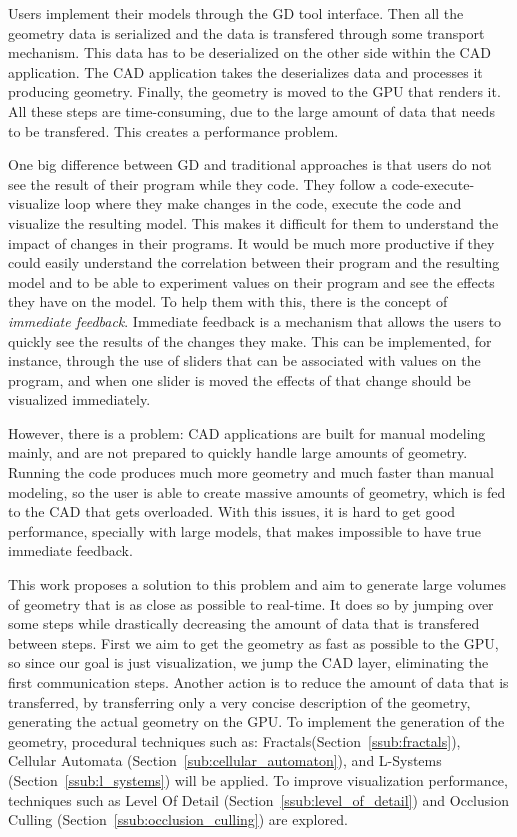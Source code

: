 Users implement their models through the GD tool interface. Then all the geometry data is serialized and the data is transfered through some transport mechanism. This data has to be deserialized on the other side within the CAD application. The CAD application takes the deserializes data and processes it producing geometry. Finally, the geometry is moved to the GPU that renders it. All these steps are time-consuming, due to the large amount of data that needs to be transfered. This creates a performance problem.

One big difference between GD and traditional approaches is that users do not see the result of their program while they code. They follow a code-execute-visualize loop where they make changes in the code, execute the code and visualize the resulting model. This makes it difficult for them to understand the impact of changes in their programs. It would be much more productive if they could easily understand the correlation between their program and the resulting model and to be able to experiment values on their program and see the effects they have on the model. To help them with this, there is the concept of \emph{immediate feedback}. Immediate feedback is a mechanism that allows the users to quickly see the results of the changes they make. This can be implemented, for instance, through the use of sliders that can be associated with values on the program, and when one slider is moved the effects of that change should be visualized immediately. 

However, there is a problem: CAD applications are built for manual modeling mainly, and are not prepared to quickly handle large amounts of geometry. Running the code produces much more geometry and much faster than manual modeling, so the user is able to create massive amounts of geometry, which is fed to the CAD that gets overloaded. With this issues, it is hard to get good performance, specially with large models, that makes impossible to have true immediate feedback.

This work proposes a solution to this problem and aim to generate large volumes of geometry that is as close as possible to real-time. It does so by jumping over some steps while drastically decreasing the amount of data that is transfered between steps. First we aim to get the geometry as fast as possible to the GPU, so since our goal is just visualization, we jump the CAD layer, eliminating the first communication steps. Another action is to reduce the amount of data that is transferred, by transferring only a very concise description of the geometry, generating the actual geometry on the GPU. To implement the generation of the geometry, procedural techniques such as: Fractals(Section~\ref{ssub:fractals}), Cellular Automata (Section~\ref{sub:cellular_automaton}), and L-Systems (Section~\ref{ssub:l_systems}) will be applied. 
To improve visualization performance, techniques such as Level Of Detail (Section~\ref{ssub:level_of_detail}) and Occlusion Culling (Section~\ref{ssub:occlusion_culling}) are explored.

